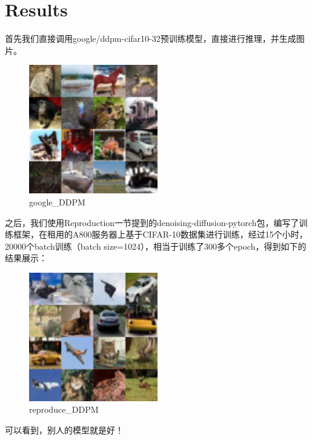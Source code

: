 \documentclass{ctexart}
\begin{document}
\section{Results}
\noindent
首先我们直接调用google/ddpm-cifar10-32预训练模型，直接进行推理，并生成图片。
\begin{figure}[H]
     \centering
     \includegraphics[width=0.5\textwidth]{ddpm_cifar10_grid1.png}
     \caption{google\_DDPM}
     \label{fig:google_ddpm}  %
\end{figure}

\noindent
之后，我们使用Reproduction一节提到的denoising-diffusion-pytorch包，编写了训练框架，在租用的A800服务器上基于CIFAR-10数据集进行训练，经过15个小时，20000个batch训练（batch size=1024），相当于训练了300多个epoch，得到如下的结果展示：
\begin{figure}[H]
     \centering
     \includegraphics[width=0.5\textwidth]{ddpm_cifar10_grid.png}
     \caption{reproduce\_DDPM}
     \label{fig:reproduce_ddpm}  %
\end{figure}

\noindent
可以看到，别人的模型就是好！
\end{document}
